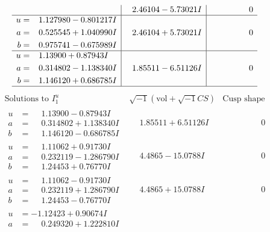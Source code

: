 \documentclass[1p]{elsarticle_modified}
\theoremstyle{definition}
\newcommand{\I}{\sqrt{-1}}
\begin{document}
$$\begin{array}{c|c|c}
 & \phantom{-}2.46104 - 5.73021 I & \phantom{-0.000000 } 0 \\ \hline\begin{aligned}
u &= \phantom{-}1.127980 - 0.801217 I \\
a &= \phantom{-}0.525545 + 1.040990 I \\
b &= \phantom{-}0.975741 - 0.675989 I\end{aligned}
 & \phantom{-}2.46104 + 5.73021 I & \phantom{-0.000000 } 0 \\ \hline\begin{aligned}
u &= \phantom{-}1.13900 + 0.87943 I \\
a &= \phantom{-}0.314802 - 1.138340 I \\
b &= \phantom{-}1.146120 + 0.686785 I\end{aligned}
 & \phantom{-}1.85511 - 6.51126 I & \phantom{-0.000000 } 0\\
 \hline 
 \end{array}$$\newpage$$\begin{array}{c|c|c}  
\text{Solutions to }I^u_{1}& \I (\text{vol} + \sqrt{-1}CS) & \text{Cusp shape}\\
 \hline 
\begin{aligned}
u &= \phantom{-}1.13900 - 0.87943 I \\
a &= \phantom{-}0.314802 + 1.138340 I \\
b &= \phantom{-}1.146120 - 0.686785 I\end{aligned}
 & \phantom{-}1.85511 + 6.51126 I & \phantom{-0.000000 } 0 \\ \hline\begin{aligned}
u &= \phantom{-}1.11062 + 0.91730 I \\
a &= \phantom{-}0.232119 - 1.286790 I \\
b &= \phantom{-}1.24453 + 0.76770 I\end{aligned}
 & \phantom{-}4.4865 - 15.0788 I & \phantom{-0.000000 } 0 \\ \hline\begin{aligned}
u &= \phantom{-}1.11062 - 0.91730 I \\
a &= \phantom{-}0.232119 + 1.286790 I \\
b &= \phantom{-}1.24453 - 0.76770 I\end{aligned}
 & \phantom{-}4.4865 + 15.0788 I & \phantom{-0.000000 } 0 \\ \hline\begin{aligned}
u &= -1.12423 + 0.90674 I \\
a &= \phantom{-}0.249320 + 1.222810 I \\

\end{aligned}
\end{array}$$
\end{document}
